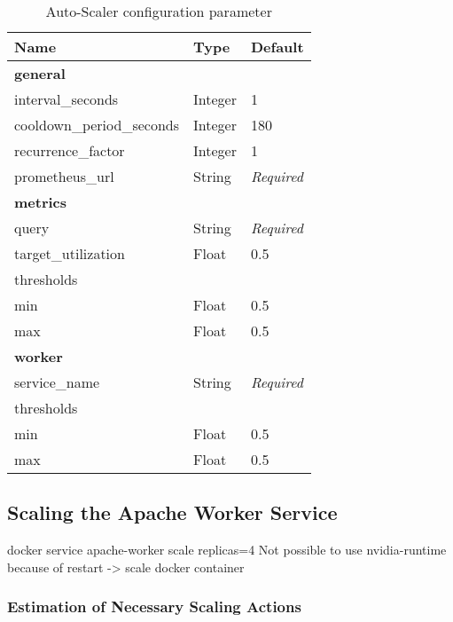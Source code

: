 \begin{table}[]
\centering
\begin{tabular}{@{}lll@{}}
\toprule
Name                      & Type    & Default           \\ \midrule
\multicolumn{3}{l}{\textbf{general}}                    \\ \midrule
interval\_seconds         & Integer & 1                 \\
cooldown\_period\_seconds & Integer & 180               \\
recurrence\_factor        & Integer & 1                 \\
prometheus\_url           & String  & \textit{Required} \\
\multicolumn{3}{l}{\textbf{metrics}}                    \\ \midrule
query                     & String  & \textit{Required} \\
target\_utilization       & Float   & 0.5               \\
\multicolumn{3}{l}{thresholds}                          \\
min                       & Float   & 0.5               \\
max                       & Float   & 0.5               \\
\multicolumn{3}{l}{\textbf{worker}}                     \\ \midrule
service\_name             & String  & \textit{Required} \\
\multicolumn{3}{l}{thresholds}                          \\
min                       & Float   & 0.5               \\
max                       & Float   & 0.5               \\ \bottomrule
\end{tabular}
\caption{Auto-Scaler configuration parameter}
\label{table:06_auto-scaler_config_parameter}
\end{table}


\subsection{Scaling the Apache Worker Service}
docker service apache-worker scale replicas=4
Not possible to use nvidia-runtime because of restart -> scale docker container


\subsubsection{Estimation of Necessary Scaling Actions}

